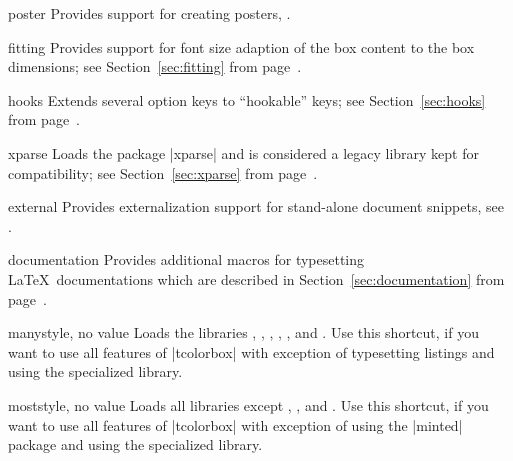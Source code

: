 {\begin{docTcbKey}[library]{poster}{}{}
  Provides support for creating posters, .
\end{docTcbKey}

\begin{docTcbKey}[library]{fitting}{}{}
  Provides support for font size adaption of the box content to
  the box dimensions;
  see Section~\ref{sec:fitting} from page~\pageref{sec:fitting}.
\end{docTcbKey}

\begin{docTcbKey}[library]{hooks}{}{}
  Extends several option keys to \enquote{hookable} keys;
  see Section~\ref{sec:hooks} from page~\pageref{sec:hooks}.
\end{docTcbKey}

\clearpage
\begin{docTcbKey}[library]{xparse}{}{}
  Loads the package |xparse| and is considered a legacy library kept for compatibility;
  see Section~\ref{sec:xparse} from page~\pageref{sec:xparse}.
\end{docTcbKey}

\begin{docTcbKey}[library]{external}{}{}
  Provides externalization support for stand-alone document snippets,
  see .
\end{docTcbKey}

\begin{docTcbKey}[library]{documentation}{}{}
  Provides additional
  macros for typesetting \LaTeX\ documentations
  which are described in Section~\ref{sec:documentation}
  from page~\pageref{sec:documentation}.
\end{docTcbKey}

\begin{docTcbKey}[library]{many}{}{style, no value}
  Loads the libraries , , , ,
  , and .
  Use this shortcut, if you want to use all features of |tcolorbox|
  with exception of typesetting listings and using
  the specialized  library.
\end{docTcbKey}

\begin{docTcbKey}[library]{most}{}{style, no value}
  Loads all libraries except , , and .
  Use this shortcut, if you want to use all features of |tcolorbox|
  with exception of using the |minted| package and using
  the specialized  library.
\end{docTcbKey}

}
